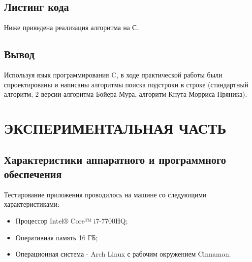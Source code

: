 \documentclass[a4paper,12pt]{article}
\begin{document}
\subsection{Листинг кода}
Ниже приведена реализация алгоритма на С.\\

%
\newpage

%
\newpage

%
\newpage


\newpage
\subsection{Вывод}
Используя язык программирования C, в ходе практической работы были спроектированы и написаны алгоритмы поиска подстроки в строке (стандартный алгоритм, 2 версии алгоритма Бойера-Мура, алгоритм Кнута-Морриса-Пряника).

\newpage
\section{ЭКСПЕРИМЕНТАЛЬНАЯ ЧАСТЬ}
\subsection{Характеристики аппаратного и программного обеспечения}
Тестирование приложения проводилось на машине со следующими характеристиками:\\
\begin{itemize}
\item Процессор Intel® Core™ i7-7700HQ;
\item Оперативная память 16 ГБ;
\item Операционная система - Arch Linux с рабочим окружением Cinnamon.
\end{itemize}
\end{document}
